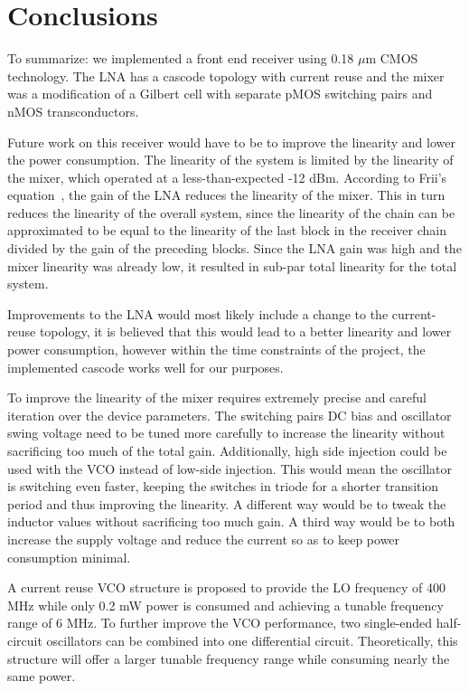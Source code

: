 \section{Conclusions}

To summarize: we implemented a front end receiver using 0.18 $\mu$m CMOS technology. The LNA has a cascode topology with current reuse and the mixer was a modification of a Gilbert cell with separate pMOS switching pairs and nMOS transconductors. 

Future work on this receiver would have to be to improve the linearity and lower the power consumption. The linearity of the system is limited by the linearity of the mixer, which operated at a less-than-expected -12 dBm. According to Frii's equation~\cite{Razavi}, the gain of the LNA reduces the linearity of the mixer. This in turn reduces the linearity of the overall system, since the linearity of the chain can be approximated to be equal to the linearity of the last block in the receiver chain divided by the gain of the preceding blocks. Since the LNA gain was high and the mixer linearity was already low, it resulted in sub-par total linearity for the total system. 

Improvements to the LNA would most likely include a change to the current-reuse topology, it is believed that this would lead to a better linearity and lower power consumption, however within the time constraints of the project, the implemented cascode works well for our purposes.

To improve the linearity of the mixer requires extremely precise and careful iteration over the device parameters. The switching pairs DC bias and oscillator swing voltage need to be tuned more carefully to increase the linearity without sacrificing too much of the total gain. Additionally, high side injection could be used with the VCO instead of low-side injection. This would mean the oscillator is switching even faster, keeping the switches in triode for a shorter transition period and thus improving the linearity. A different way would be to tweak the inductor values without sacrificing too much gain. A third way would be to both increase the supply voltage and reduce the current so as to keep power consumption minimal.

A current reuse VCO structure is proposed to provide the LO frequency of 400 MHz while only 0.2 mW power is consumed and achieving a tunable frequency range of 6 MHz. To further improve the VCO performance, two single-ended half-circuit oscillators can be combined into one differential circuit. Theoretically, this structure will offer a larger tunable frequency range while consuming nearly the same power.

